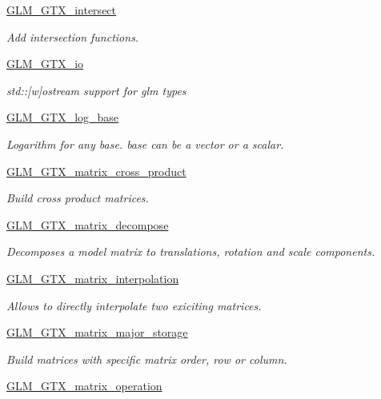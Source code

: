 \begin{DoxyCompactItemize}
\hyperlink{group__gtx__intersect}{G\-L\-M\-\_\-\-G\-T\-X\-\_\-intersect}
\begin{DoxyCompactList}\small\item\em Add intersection functions. \end{DoxyCompactList}\item 
\hyperlink{group__gtx__io}{G\-L\-M\-\_\-\-G\-T\-X\-\_\-io}
\begin{DoxyCompactList}\small\item\em std\-:\-:\mbox{[}w\mbox{]}ostream support for glm types \end{DoxyCompactList}\item 
\hyperlink{group__gtx__log__base}{G\-L\-M\-\_\-\-G\-T\-X\-\_\-log\-\_\-base}
\begin{DoxyCompactList}\small\item\em Logarithm for any base. base can be a vector or a scalar. \end{DoxyCompactList}\item 
\hyperlink{group__gtx__matrix__cross__product}{G\-L\-M\-\_\-\-G\-T\-X\-\_\-matrix\-\_\-cross\-\_\-product}
\begin{DoxyCompactList}\small\item\em Build cross product matrices. \end{DoxyCompactList}\item 
\hyperlink{group__gtx__matrix__decompose}{G\-L\-M\-\_\-\-G\-T\-X\-\_\-matrix\-\_\-decompose}
\begin{DoxyCompactList}\small\item\em Decomposes a model matrix to translations, rotation and scale components. \end{DoxyCompactList}\item 
\hyperlink{group__gtx__matrix__interpolation}{G\-L\-M\-\_\-\-G\-T\-X\-\_\-matrix\-\_\-interpolation}
\begin{DoxyCompactList}\small\item\em Allows to directly interpolate two exiciting matrices. \end{DoxyCompactList}\item 
\hyperlink{group__gtx__matrix__major__storage}{G\-L\-M\-\_\-\-G\-T\-X\-\_\-matrix\-\_\-major\-\_\-storage}
\begin{DoxyCompactList}\small\item\em Build matrices with specific matrix order, row or column. \end{DoxyCompactList}\item 
\hyperlink{group__gtx__matrix__operation}{G\-L\-M\-\_\-\-G\-T\-X\-\_\-matrix\-\_\-operation}

\end{DoxyCompactItemize}

